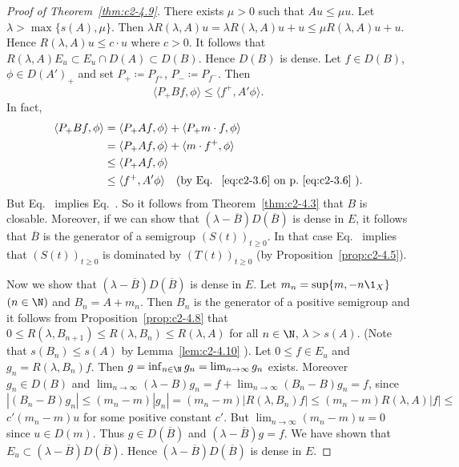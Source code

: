 \begin{proof}[Proof of Theorem~\ref{thm:c2-4.9}]  
There exists $\mu > 0$ such that $Au \leq \mu u$.
Let $\lambda > \max \{s(A),\mu\}$.
Then $\lambda R(\lambda,A)u = \lambda R(\lambda,A)u+u \leq \mu R(\lambda,A)u + u$.
Hence $R(\lambda,A)u \leq c \cdot u$ where $c > 0$.
It follows that $R(\lambda,A)E_{u} \subset E_{u} \cap D(A) \subset D(B)$.
Hence $D(B)$ is dense.
Let $f \in D(B)$, $\phi \in D(A')_{+}$ and set $P_{+} \coloneqq P_{f^{+}}$, $P_{-} \coloneqq P_{f^{-}}$.
Then
\begin{equation}\label{eq:c2-4.11}
\langle P_{+} Bf,\phi \rangle \leq \langle f^{+},A'\phi \rangle.
\end{equation}
In fact, 
\begin{align*}
\langle P_{+} Bf, \phi \rangle &= \langle P_{+} Af, \phi \rangle + \langle P_{+} m \cdot f, \phi \rangle\\
&= \langle P_{+} Af, \phi \rangle + \langle m \cdot f^{+}, \phi \rangle\\
&\leq \langle P_{+} Af, \phi \rangle\\
&\leq \langle f^{+}, A'\phi \rangle \quad \text{(by Eq.~\myeqpageref{eq:c2-3.6})}.
\end{align*}
But Eq.~ implies Eq.~.
So it follows from Theorem~\ref{thm:c2-4.3}   that $B$ is closable.
Moreover, if we can show that $(\lambda - \overline{B})D(\overline{B})$ is dense in $E$, it follows that $\overline{B}$ is the generator of a semigroup $(S(t))_{t \geq 0}$.
In that case Eq.~ implies that $(S(t))_{t \geq 0}$ is dominated by $(T(t))_{t \geq 0}$ 
(by Proposition~\ref{prop:c2-4.5}).

Now we show that $(\lambda - \overline{B})D(\overline{B})$ is dense in $E$.
Let $m_{n} = \sup \{m, -n \1_{X}\}$ $(n \in \N )$ and $B_{n} = A + m_{n}$.
Then $B_{n}$ is the generator of a positive semigroup and it follows from Proposition~\ref{prop:c2-4.8}   that $0 \leq R(\lambda,B_{n+1}) \leq R(\lambda,B_{n}) \leq R(\lambda,A)$ for all $n \in \N $, $\lambda > s(A)$.
(Note that $s(B_{n}) \leq s(A)$ by Lemma~\ref{lem:c2-4.10}   ).
Let $0 \leq f \in E_{u}$ and $g_{n} = R(\lambda,B_{n})f$.
Then $g = \inf_{n \in \N } g_{n} = \lim_{n \to \infty} g_{n}$ exists.
Moreover $g_{n} \in D(B)$ and $\lim_{n \to \infty} (\lambda - B)g_{n} = f + \lim_{n \to \infty} (B_{n} - B)g_{n} = f$, since
$|(B_{n} - B)g_{n}| \leq (m_{n} - m)|g_{n}| = (m_{n} - m)|R(\lambda,B_{n})f| \leq (m_{n} - m)R(\lambda,A)|f| \leq$
$c' (m_{n} - m)u$ for some positive constant $c'$.
But $\lim_{n \to \infty} (m_{n} - m)u = 0$ since $u \in D(m)$.
Thus $g \in D(\overline{B})$ and $(\lambda - \overline{B})g = f$.
We have shown that $E_{u} \subset (\lambda - \overline{B})D(\overline{B})$.
Hence $(\lambda - \overline{B})D(\overline{B})$ is dense in $E$.
\end{proof}
